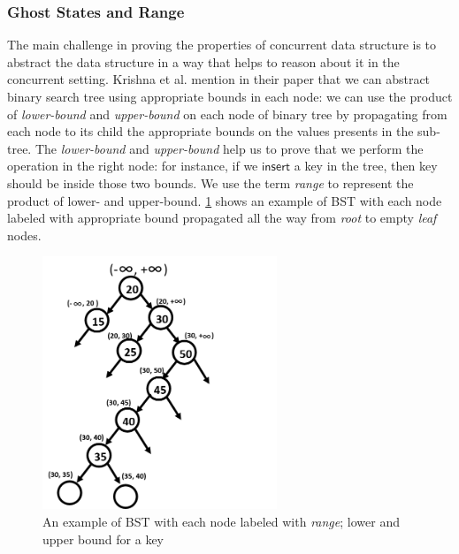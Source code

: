 \documentclass[acmsmall,screen]{acmart}\settopmatter{printfolios=true}
\begin{document}
\subsubsection{Ghost States and Range}
 The main challenge in proving the properties of concurrent data structure is to abstract the data structure in a way that helps to reason about it in the concurrent setting. Krishna et al. \cite{krishna2017flow} mention in their paper that we can abstract binary search tree using appropriate bounds in each node: we can use the product of \emph{lower-bound} and \emph{upper-bound} on each node of binary tree by propagating from each node to its child the appropriate bounds on the values presents in the sub-tree. The \emph{lower-bound} and \emph{upper-bound} help us to prove that we perform the operation in the right node: for instance, if we $\mathsf{insert}$ a key in the tree, then key should be inside those two bounds. We use the term \emph{range} to represent the product of lower- and upper-bound. \ref{range_bst} shows an example of BST with each node labeled with appropriate bound propagated all the way from \emph{root} to empty \emph{leaf} nodes. 
\begin{figure}[htb]
\centering
\includegraphics[width=70mm,scale=0.5]{FIG/range_prop.png}
\caption{An example of BST with each node labeled with \emph{range}; lower and upper bound for a key}
\label{range_bst}
\end{figure}
\end{document}
